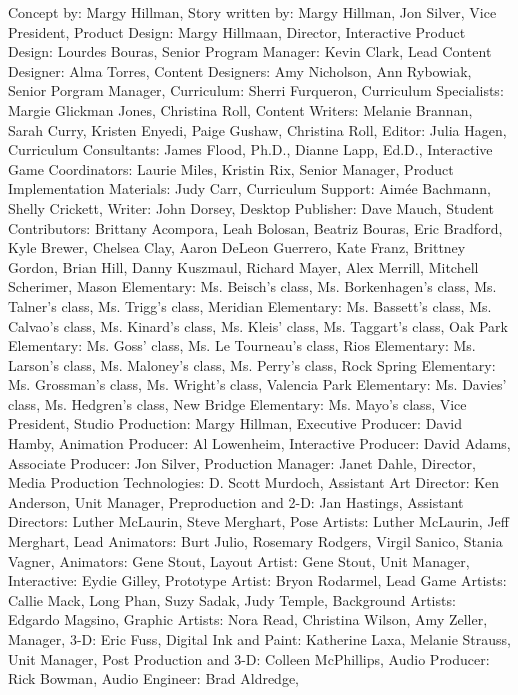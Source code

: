 Concept by: Margy Hillman,
Story written by: Margy Hillman, Jon Silver,
Vice President, Product Design: Margy Hillmaan,
Director, Interactive Product Design: Lourdes Bouras,
Senior Program Manager: Kevin Clark,
Lead Content Designer: Alma Torres,
Content Designers: Amy Nicholson, Ann Rybowiak,
Senior Porgram Manager, Curriculum: Sherri Furqueron,
Curriculum Specialists: Margie Glickman Jones, Christina Roll,
Content Writers: Melanie Brannan, Sarah Curry, Kristen Enyedi, Paige Gushaw, Christina Roll,
Editor: Julia Hagen,
Curriculum Consultants: James Flood, Ph.D., Dianne Lapp, Ed.D.,
Interactive Game Coordinators: Laurie Miles, Kristin Rix,
Senior Manager, Product Implementation Materials: Judy Carr,
Curriculum Support: Aimée Bachmann, Shelly Crickett,
Writer: John Dorsey,
Desktop Publisher: Dave Mauch,
Student Contributors: Brittany Acompora, Leah Bolosan, Beatriz Bouras, Eric Bradford, Kyle Brewer, Chelsea Clay, Aaron DeLeon Guerrero, Kate Franz, Brittney Gordon, Brian Hill, Danny Kuszmaul, Richard Mayer, Alex Merrill, Mitchell Scherimer,
Mason Elementary: Ms. Beisch's class, Ms. Borkenhagen's class, Ms. Talner's class, Ms. Trigg's class,
Meridian Elementary: Ms. Bassett's class, Ms. Calvao's class, Ms. Kinard's class, Ms. Kleis' class, Ms. Taggart's class,
Oak Park Elementary: Ms. Goss' class, Ms. Le Tourneau's class,
Rios Elementary: Ms. Larson's class, Ms. Maloney's class, Ms. Perry's class,
Rock Spring Elementary: Ms. Grossman's class, Ms. Wright's class,
Valencia Park Elementary: Ms. Davies' class, Ms. Hedgren's class,
New Bridge Elementary: Ms. Mayo's class,
Vice President, Studio Production: Margy Hillman,
Executive Producer: David Hamby,
Animation Producer: Al Lowenheim,
Interactive Producer: David Adams,
Associate Producer: Jon Silver,
Production Manager: Janet Dahle,
Director, Media Production Technologies: D. Scott Murdoch,
Assistant Art Director: Ken Anderson,
Unit Manager, Preproduction and 2-D: Jan Hastings,
Assistant Directors: Luther McLaurin, Steve Merghart,
Pose Artists: Luther McLaurin, Jeff Merghart,
Lead Animators: Burt Julio, Rosemary Rodgers, Virgil Sanico, Stania Vagner,
Animators: Gene Stout,
Layout Artist: Gene Stout,
Unit Manager, Interactive: Eydie Gilley,
Prototype Artist: Bryon Rodarmel,
Lead Game Artists: Callie Mack, Long Phan, Suzy Sadak, Judy Temple,
Background Artists: Edgardo Magsino,
Graphic Artists: Nora Read, Christina Wilson, Amy Zeller,
Manager, 3-D: Eric Fuss,
Digital Ink and Paint: Katherine Laxa, Melanie Strauss,
Unit Manager, Post Production and 3-D: Colleen McPhillips,
Audio Producer: Rick Bowman,
Audio Engineer: Brad Aldredge,
